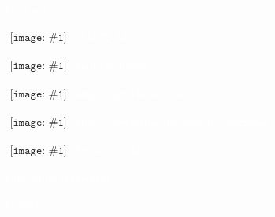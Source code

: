
\newcommand{\ContactEntry}[2]{
	\scriptsize	
	$\begin{array}{l}
	{\texttt{[image: \#1]}}
	\end{array}
	$ #2
}


\hspace*{-30pt}
\begin{minipage}[t]{0.47\textwidth}
	\vspace{85pt}
	\large
	\textcolor{white}{\hspace{5pt}Contacts}
	\vspace{-10pt}
	\begin{multicols}{2}
		\ContactEntry{images/green/ic_phone}{\textcolor{white}{111-222-3333}}

		\ContactEntry{images/green/ic_email}{\textcolor{white}{mail@mail.com}}

		\ContactEntry{images/green/ic_web}{\textcolor{white}{http://mywebsite.com}}

		\ContactEntry{images/green/ic_people}{\textcolor{white}{https://www.linkedin.com/in/yourname}}

		\columnbreak

		\ContactEntry{images/green/ic_home}{\textcolor{white}{Street, number}

		\hspace{19pt}\textcolor{white}{City, State 0000-0000}

		\hspace{19pt}\textcolor{white}{Country}}
	\end{multicols}
	\vspace{0.1pt}
\end{minipage}

